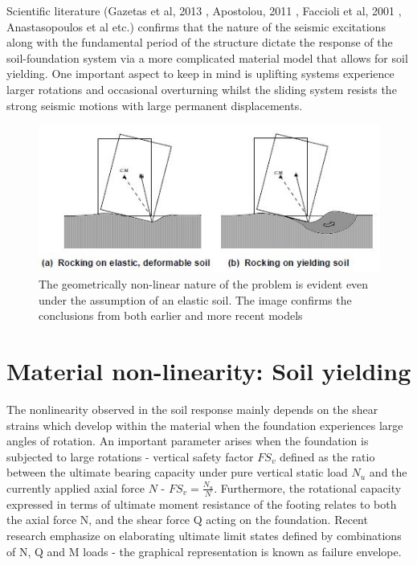 \documentclass[12pt,a4paper]{report}
\begin{document}
Scientific literature (Gazetas et al, 2013 \cite{gazetas2013nonlinear}, Apostolou, 2011 \cite{apostolou2011soil}, Faccioli et al, 2001 \cite{faccioli2001investigation}, Anastasopoulos et al \cite{anastasopoulos2010soil} etc.) confirms that the nature of the seismic excitations along with the fundamental period of the structure dictate the response of the soil-foundation system via a more complicated material model that allows for soil yielding. One important aspect to keep in mind is uplifting systems experience larger rotations and occasional overturning whilst the sliding system resists the strong seismic motions with large permanent displacements.

\begin{figure}[h!]
	\centering
	\includegraphics[width=0.7\linewidth]{"rocking"}
	\caption{The geometrically non-linear nature of the problem is evident even under the assumption of an elastic soil. The image confirms the conclusions from both earlier and more recent models }
	\label{rocking}
\end{figure}

\section{Material non-linearity: Soil yielding}
The nonlinearity observed in the soil response mainly depends on the shear strains which develop within the material when the foundation experiences large angles of rotation. An important parameter arises when the foundation is subjected to large rotations - vertical safety factor $FS_v$ defined as the ratio between the ultimate bearing capacity under pure vertical static load $N_u$ and the currently applied axial force $N$ - $FS_v = \frac{N_u}{N}$. Furthermore, the rotational capacity expressed in terms of ultimate moment resistance of the footing relates to both the axial force N, and the shear force Q acting on the foundation. Recent research emphasize on elaborating ultimate limit states defined by combinations of N, Q and M loads - the graphical representation is known as failure envelope. 
\end{document}
